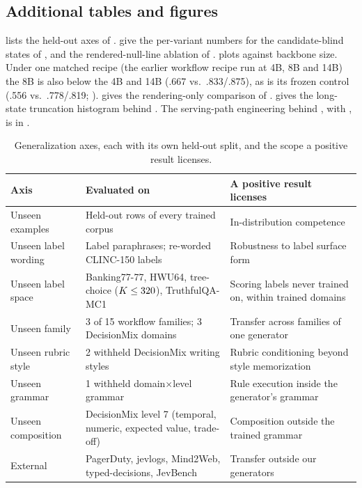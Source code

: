\subsection{Additional tables and figures}
\label{app:extra-figures}

 lists the held-out axes of .
 give the per-variant numbers for the candidate-blind states of
, and  the rendered-null-line ablation of
.  plots  against backbone size. Under one matched recipe (the
earlier workflow recipe run at 4B, 8B and 14B) the 8B is also below the 4B and 14B (.667 vs.\ .833/.875),
as is its frozen control (.556 vs.\ .778/.819; ).  gives the
rendering-only comparison of .
 gives the long-state truncation histogram behind . The
serving-path engineering behind , with , is in
.

\begin{table}[h]
  \centering
  \caption{Generalization axes, each with its own held-out split, and the scope a positive result
  licenses.}
  \label{tab:generalization}
  \small
  \begin{tabular}{p{2.5cm}p{4.9cm}p{5.2cm}}
    \toprule
    Axis & Evaluated on & A positive result licenses \\
    \midrule
    Unseen examples & Held-out rows of every trained corpus & In-distribution competence \\
    Unseen label wording & Label paraphrases; re-worded CLINC-150 labels & Robustness to label surface form \\
    Unseen label space & Banking77-77, HWU64, tree-choice ($K \le 320$), TruthfulQA-MC1 & Scoring labels never trained on, within trained domains \\
    Unseen family & 3 of 15 workflow families; 3 DecisionMix domains & Transfer across families of one generator \\
    Unseen rubric style & 2 withheld DecisionMix writing styles & Rubric conditioning beyond style memorization \\
    Unseen grammar & 1 withheld domain$\times$level grammar & Rule execution inside the generator's grammar \\
    Unseen composition & DecisionMix level 7 (temporal, numeric, expected value, trade-off) & Composition outside the trained grammar \\
    External & PagerDuty, jevlogs, Mind2Web, typed-decisions, JevBench & Transfer outside our generators \\
    \bottomrule
  \end{tabular}
\end{table}

